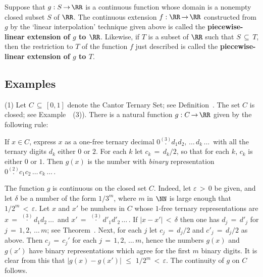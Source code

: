 \V

        Suppose that $g:S \,{\rightarrow}\, {\RR}$ is a continuous function whose domain is a nonempty closed subset $S$ of ${\RR}$.
    The continuous extension $f:{\RR} \,{\rightarrow}\, {\RR}$ constructed from $g$ by the `linear interpolation' technique given above is called the {\bf piecewise-linear extension of $g$ to ${\RR}$}.
    Likewise, if $T$ is a subset of ${\RR}$ such that $S \,{\subseteq}\, T$, 
    then the restriction to $T$ of the function $f$ just described is called the {\bf piecewise-linear extension of $g$ to $T$}.

\V
\V

            \subsection{\small{\bf Examples}}
            \label{ExampF20.40}

\V

\hspace*{\parindent}(1) Let $C \,{\subseteq}\, [0,1]$ denote the Cantor Ternary Set; see Definition~.
    The set $C$ is closed; see Example~~(3)).
    There is a natural function $g:C \,{\rightarrow}\, {\RR}$ given by the following rule:

        If $x{\in}C$, express $x$ as a one-free ternary decimal $0 \stackrel{(3)}{.}d_{1}d_{2},\,{\ldots}\,d_{k}\,{\ldots}\,$ with all the ternary digits $d_{k}$ either $0$ or $2$.
    For each $k$ let $c_{k} \,=\, d_{k}/2$, so that for each $k$, $c_{k}$ is either $0$ or $1$.
    Then $g(x)$ is the number with {\em binary} representation $0 \stackrel{(2)}{.}c_{1}c_{2}\,{\ldots}\,c_{k}\,{\ldots}\,$.

        The function $g$ is continuous on the closed set $C$. Indeed, let ${\varepsilon}\,>\,0$ be given, and let ${\delta}$ be a number of the form $1/3^{m}$, where $m$ in ${\NN}$ is large enough that $1/2^{m}\,<\,{\varepsilon}$.
    Let $x$ and $x'$ be numbers in $C$ whose $1$-free ternary representations are $x \,=\,  \stackrel{(3)}{{\cdot}}d_{1}d_{2}\,{\ldots}\,$ and $x' \,=\,  \stackrel{(3)}{{\cdot}}d'_{1}d'_{2}\,{\ldots}\,$.
    If $|x-x'|\,<\,{\delta}$ then one has $d_{j} \,=\, d'_{j}$ for $j \,=\, 1,2,\,{\ldots}\,m$;
    see Theorem~.
    Next, for each $j$ let $c_{j} \,=\, d_{j}/2$ and $c'_{j} \,=\, d_{j}/2$ as above.
    Then $c_{j} \,=\, c_{j}'$ for each $j \,=\, 1,2,\,{\ldots}\,m$, hence the numbers $g(x)$ and $g(x')$ have binary representations which agree for the first $m$ binary digits.
    It is clear from this that $|g(x)-g(x')|\,\,{\leq}\,\,1/2^{m}\,<\,{\varepsilon}$.
    The continuity of $g$ on $C$ follows.

